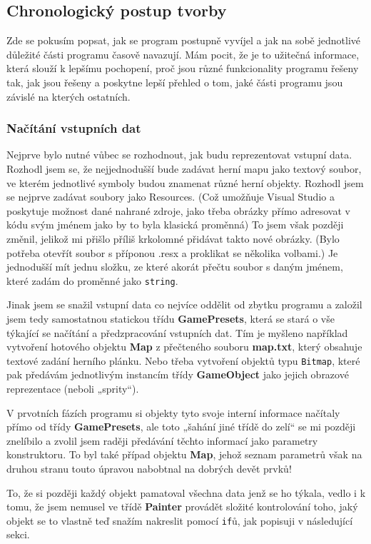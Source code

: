 \documentclass[a4]{article}
\begin{document}
\subsection{Chronologický postup tvorby}
Zde se pokusím popsat, jak se program postupně vyvíjel a jak na sobě jednotlivé důležité části programu časově navazují. Mám pocit, že je to užitečná informace, která slouží k lepšímu pochopení, proč jsou různé funkcionality programu řešeny tak, jak jsou řešeny a poskytne lepší přehled o tom, jaké části programu jsou závislé na kterých ostatních.

\subsubsection{Načítání vstupních dat}
Nejprve bylo nutné vůbec se rozhodnout, jak budu reprezentovat vstupní data. Rozhodl jsem se, že nejjednodušší bude zadávat herní mapu jako textový soubor, ve kterém jednotlivé symboly budou znamenat různé herní objekty. Rozhodl jsem se nejprve zadávat soubory jako Resources. (Což umožňuje Visual Studio a poskytuje možnost dané nahrané zdroje, jako třeba obrázky přímo adresovat v kódu svým jménem jako by to byla klasická proměnná) To jsem však později změnil, jelikož mi přišlo příliš krkolomné přidávat takto nové obrázky. (Bylo potřeba otevřít soubor s příponou .resx a proklikat se několika volbami.) Je jednodušší mít jednu složku, ze které akorát přečtu soubor s daným jménem, které zadám do proměnné jako \verb|string|.

Jinak jsem se snažil vstupní data co nejvíce oddělit od zbytku programu a založil jsem tedy samostatnou statickou třídu \textbf{GamePresets}, která se stará o vše týkající se načítání a předzpracování vstupních dat. Tím je myšleno například vytvoření hotového objektu \textbf{Map} z přečteného souboru \textbf{map.txt}, který obsahuje textové zadání herního plánku. Nebo třeba vytvoření objektů typu \verb|Bitmap|, které pak předávám jednotlivým instancím třídy \textbf{GameObject} jako jejich obrazové reprezentace (neboli „sprity“).

V prvotních fázích programu si objekty tyto svoje interní informace načítaly přímo od třídy \textbf{GamePresets}, ale toto „šahání jiné třídě do zelí“ se mi později znelíbilo a zvolil jsem raději předávání těchto informací jako parametry konstruktoru. To byl také případ objektu \textbf{Map}, jehož seznam parametrů však na druhou stranu touto úpravou nabobtnal na dobrých devět prvků!

To, že si později každý objekt pamatoval všechna data jenž se ho týkala, vedlo i k tomu, že jsem nemusel ve třídě \textbf{Painter} provádět složité kontrolování toho, jaký objekt se to vlastně teď snažím nakreslit pomocí \verb|if|ů, jak popisuji v následující sekci.
\end{document}
